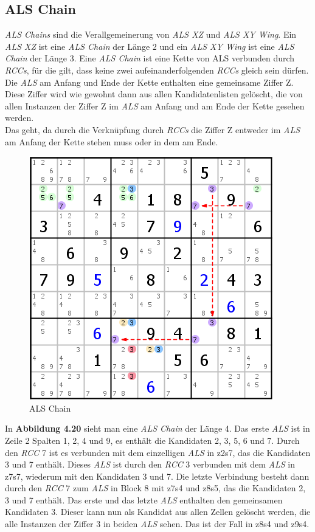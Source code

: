 \newpage
\subsection{ALS Chain}
\textit{ALS Chains} sind die Verallgemeinerung von \textit{ALS XZ} und \textit{ALS XY Wing}. Ein \textit{ALS XZ} ist eine \textit{ALS Chain} der Länge 2 und ein \textit{ALS XY Wing} ist eine \textit{ALS Chain} der Länge 3. Eine \textit{ALS Chain} ist eine Kette von {ALS} verbunden durch \textit{RCCs}, für die gilt, dass keine zwei aufeinanderfolgenden \textit{RCCs} gleich sein dürfen. Die \textit{ALS} am Anfang und Ende der Kette enthalten eine gemeinsame Ziffer Z. Diese Ziffer wird wie gewohnt dann aus allen Kandidatenlisten gelöscht, die von allen Instanzen der Ziffer Z im \textit{ALS} am Anfang und am Ende der Kette gesehen werden.\\
Das geht, da durch die Verknüpfung durch \textit{RCCs} die Ziffer Z entweder im \textit{ALS} am Anfang der Kette stehen muss oder in dem am Ende.

\begin{figure}[h]
\begin{center}
\includegraphics{./img/ALS_Chain.png}
\caption{ALS Chain}
\end{center}
\end{figure}

In \textbf{Abbildung 4.20} sieht man eine \textit{ALS Chain} der Länge 4. Das erste \textit{ALS} ist in Zeile 2 Spalten 1, 2, 4 und 9, es enthält die Kandidaten 2, 3, 5, 6 und 7. Durch den \textit{RCC} 7 ist es verbunden mit dem einzelligen \textit{ALS} in z2s7, das die Kandidaten 3 und 7 enthält. Dieses \textit{ALS} ist durch den \textit{RCC} 3 verbunden mit dem \textit{ALS} in z7s7, wiederum mit den Kandidaten 3 und 7. Die letzte Verbindung besteht dann durch den \textit{RCC} 7 zum \textit{ALS} in Block 8 mit z7s4 und z8s5, das die Kandidaten 2, 3 und 7 enthält. Das erste und das letzte \textit{ALS} enthalten den gemeinsamen Kandidaten 3. Dieser kann nun als Kandidat aus allen Zellen gelöscht werden, die alle Instanzen der Ziffer 3 in beiden \textit{ALS} sehen. Das ist der Fall in z8s4 und z9s4.